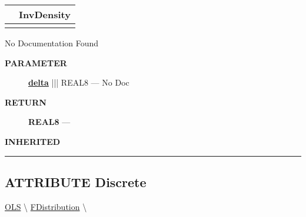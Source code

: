 {\renewcommand{\arraystretch}{1.5}
\begin{tabularx}{\textwidth}{|>{\raggedright\arraybackslash}l|X|}
\hline
\hspace{0pt}\mytexttt{\color{red} } & \textbf{InvDensity} \\
\hline
\multicolumn{2}{|>{\raggedright\arraybackslash}X|}{\hspace{0pt}\mytexttt{\color{param} (t\_FieldReal delta)}} \\
\hline
\end{tabularx}
}

\par





No Documentation Found






\par
\begin{description}
\item [\colorbox{tagtype}{\color{white} \textbf{\textsf{PARAMETER}}}] \textbf{\underline{delta}} ||| REAL8 --- No Doc
\end{description}







\par
\begin{description}
\item [\colorbox{tagtype}{\color{white} \textbf{\textsf{RETURN}}}] \textbf{REAL8} --- 
\end{description}






\par
\begin{description}
\item [\colorbox{tagtype}{\color{white} \textbf{\textsf{INHERITED}}}] 
\end{description}



\rule{\linewidth}{0.5pt}
\subsection*{\textsf{\colorbox{headtoc}{\color{white} ATTRIBUTE}
Discrete}}

\hypertarget{ecldoc:linearregression.ols.distributionbase.discrete}{}
\hspace{0pt} \hyperlink{ecldoc:linearregression.ols}{OLS} \textbackslash 
\hspace{0pt} \hyperlink{ecldoc:linearregression.ols.fdistribution}{FDistribution} \textbackslash 

